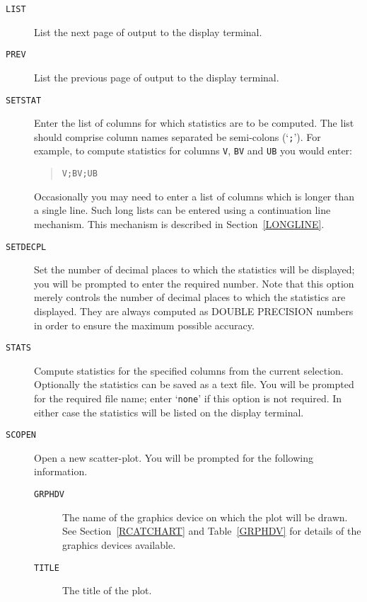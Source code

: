 \documentclass[twoside,11pt]{article}
\renewcommand{\_}{\texttt{\symbol{95}}}
\begin{document}
\begin{description}
  \item[ {\tt LIST} ] List the next page of output to the display
   terminal.

  \item[ {\tt PREV} ] List the previous page of output to the display
   terminal.

  \item[ {\tt SETSTAT} ] Enter the list of columns for which statistics
   are to be computed.  The list should comprise column names separated
   be semi-colons (`{\tt ;}').  For example, to compute statistics for
   columns {\tt V}, {\tt B\_V} and {\tt U\_B} you would enter:

  \begin{verse}
   {\tt V;B\_V;U\_B}
  \end{verse}

   Occasionally you may need to enter a list of columns which is longer
   than a single line.  Such long lists can be entered using a continuation
   line mechanism.  This mechanism is described in Section~\ref{LONGLINE}.

  \item[ {\tt SETDECPL} ] Set the number of decimal places to which the
   statistics will be displayed; you will be prompted to enter the
   required number.  Note that this option merely controls the number of
   decimal places to which the statistics are displayed.  They are
   always computed as DOUBLE PRECISION numbers in order to ensure the
   maximum possible accuracy.

  \item[ {\tt STATS} ] Compute statistics for the specified columns from
   the current selection.  Optionally the statistics can be saved as a
   text file.  You will be prompted for the required file name; enter
   `{\tt none}' if this option is not required.  In either case the
   statistics will be listed on the display terminal.

  \item[ {\tt SCOPEN} ] Open a new scatter-plot.  You will be prompted
   for the following information.

  \begin{description}

    \item[ {\tt GRPHDV} ] The name of the graphics device on which
     the plot will be drawn.  See Section~\ref{RCATCHART} and
     Table~\ref{GRPHDV} for details of the graphics devices available.

    \item[ {\tt TITLE} ] The title of the plot.


\end{description}
\end{description}
\end{document}
